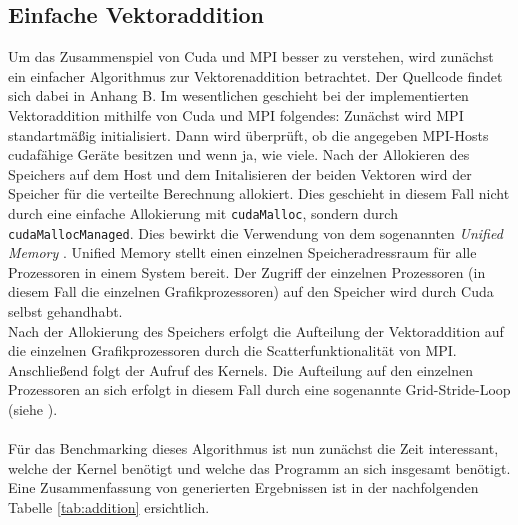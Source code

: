\documentclass[doktyp=semarbeit, sprache=german]{TUBAFarbeiten}
\begin{document}
\subsection{Einfache Vektoraddition}
Um das Zusammenspiel von Cuda und MPI besser zu verstehen, wird zunächst ein einfacher Algorithmus zur Vektorenaddition betrachtet. Der Quellcode findet sich dabei in Anhang B. Im wesentlichen geschieht bei der implementierten Vektoraddition mithilfe von Cuda und MPI folgendes: Zunächst wird MPI standartmäßig initialisiert. Dann wird überprüft, ob die angegeben MPI-Hosts cudafähige Geräte besitzen und wenn ja, wie viele. Nach der Allokieren des Speichers auf dem Host und dem Initalisieren der beiden Vektoren wird der Speicher für die verteilte Berechnung allokiert. Dies geschieht in diesem Fall nicht durch eine einfache Allokierung mit \texttt{cudaMalloc}, sondern durch \texttt{cudaMallocManaged}. Dies bewirkt die Verwendung von dem sogenannten \textit{Unified Memory} \cite{UnifiedMemory}. Unified Memory stellt einen einzelnen Speicheradressraum für alle Prozessoren in einem System bereit. Der Zugriff der einzelnen Prozessoren (in diesem Fall die einzelnen Grafikprozessoren) auf den Speicher wird durch Cuda selbst gehandhabt.
\\Nach der Allokierung des Speichers erfolgt die Aufteilung der Vektoraddition auf die einzelnen Grafikprozessoren durch die Scatterfunktionalität von MPI. Anschließend folgt der Aufruf des Kernels. Die Aufteilung auf den einzelnen Prozessoren an sich erfolgt in diesem Fall durch eine sogenannte Grid-Stride-Loop (siehe \cite{GridStride}).
\\\\Für das Benchmarking dieses Algorithmus ist nun zunächst die Zeit interessant, welche der Kernel benötigt und welche das Programm an sich insgesamt benötigt. Eine Zusammenfassung von generierten Ergebnissen ist in der nachfolgenden Tabelle \ref{tab:addition} ersichtlich.
\end{document}
